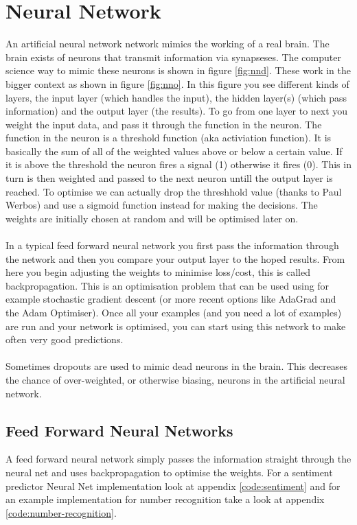 \chapter{Neural Network}

An artificial neural network network mimics the working of a real brain. The brain exists of neurons that transmit information via synapseses. The computer science way to mimic these neurons is shown in figure \ref{fig:nnd}. These work in the bigger context as shown in figure \ref{fig:nno}. In this figure you see different kinds of layers, the input layer (which handles the input), the hidden layer(s) (which pass information) and the output layer (the results). To go from one layer to next you weight the input data, and pass it through the function in the neuron. The function in the neuron is a threshold function (aka activiation function). It is basically the sum of all of the weighted values above or below a certain value. If it is above the threshold the neuron fires a signal (1) otherwise it fires (0). This in turn is then weighted and passed to the next neuron untill the output layer is reached. To optimise we can actually drop the threshhold value (thanks to Paul Werbos) and use a sigmoid function instead for making the decisions. The weights are initially chosen at random and will be optimised later on.
\\\\
In a typical feed forward neural network you first pass the information through the network and then you compare your output layer to the hoped results. From here you begin adjusting the weights to minimise loss/cost, this is called backpropagation. This is an optimisation problem that can be used using for example stochastic gradient descent (or more recent options like AdaGrad and the Adam Optimiser). Once all your examples (and you need a lot of examples) are run and your network is optimised, you can start using this network to make often very good predictions.
\\\\
Sometimes dropouts are used to mimic dead neurons in the brain. This decreases the chance of over-weighted, or otherwise biasing, neurons in the artificial neural network.

\section{Feed Forward Neural Networks}
A feed forward neural network simply passes the information straight through the neural net and uses backpropagation to optimise the weights. For a sentiment predictor Neural Net implementation look at appendix \ref{code:sentiment} and for an example implementation for number recognition take a look at appendix \ref{code:number-recognition}.

